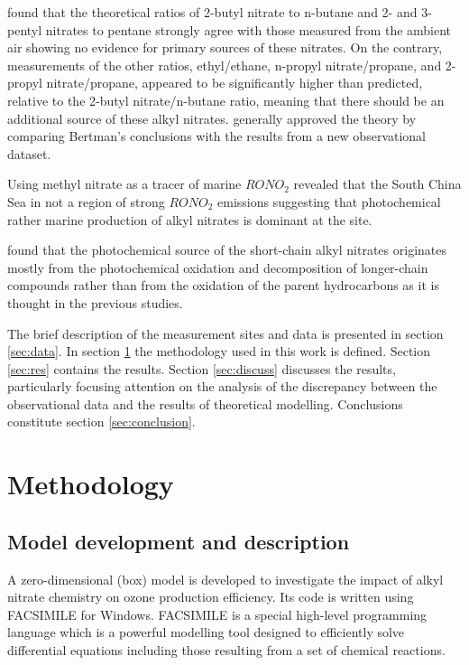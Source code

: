 \documentclass[11pt,a4paper]{article}
\begin{document}
\cite{Bertman1995} found that the theoretical ratios of  2-butyl nitrate to n-butane and 2- and 3-pentyl nitrates to pentane strongly agree with those measured from the ambient air showing no evidence for primary sources of these nitrates. On the contrary, measurements of the other ratios, ethyl/ethane, n-propyl nitrate/propane, and 2-propyl nitrate/propane, appeared to be significantly higher than predicted, relative to the 2-butyl nitrate/n-butane ratio, meaning that there should be an additional source of these alkyl nitrates. \cite{Roberts1998} generally approved the theory by comparing Bertman's conclusions with the results from a new observational dataset.

Using methyl nitrate as a tracer of marine $RONO_2$ \cite{Simpson2006} revealed that the South China Sea in not a region of strong $RONO_2$ emissions suggesting that photochemical rather marine production of alkyl nitrates is dominant at the site.

\cite{Worton2010} found that the photochemical source of the short-chain alkyl nitrates originates mostly from the photochemical oxidation and decomposition of longer-chain compounds rather than from the oxidation of the parent hydrocarbons as it is thought in the previous studies.

The brief description of the measurement sites and data is presented in section \ref{sec:data}. In section \ref{sec:method} the methodology used in this work is defined. Section \ref{sec:res} contains the results. Section \ref{sec:discuss} discusses the results, particularly focusing attention on the analysis of the discrepancy between the observational data and the results of theoretical modelling. Conclusions constitute section \ref{sec:conclusion}.

\section{Methodology} \label{sec:method}
\subsection{Model development and description}
A zero-dimensional (box) model is developed to investigate the impact of alkyl nitrate chemistry on ozone production efficiency. Its code is written using FACSIMILE for Windows. FACSIMILE is a special high-level programming language which is a powerful modelling tool designed to efficiently solve differential equations including those resulting from a set of chemical reactions.
\end{document}
